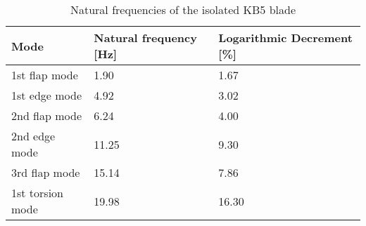 \begin{table}[pth]
\centering
\caption{Natural frequencies of the isolated KB5 blade}
\label{tab:eigen}
\begin{tabular}{|l|l|l|}
\hline
Mode             & Natural frequency {[}Hz{]} & Logarithmic Decrement {[}\%{]} \\ \hline
1st flap mode    & 1.90                       & 1.67                           \\
1st edge mode    & 4.92                       & 3.02                           \\
2nd flap mode    & 6.24                       & 4.00                           \\
2nd edge mode    & 11.25                      & 9.30                           \\
3rd flap mode    & 15.14                      & 7.86                           \\
1st torsion mode & 19.98                      & 16.30                          \\
\hline
\end{tabular}
\end{table}